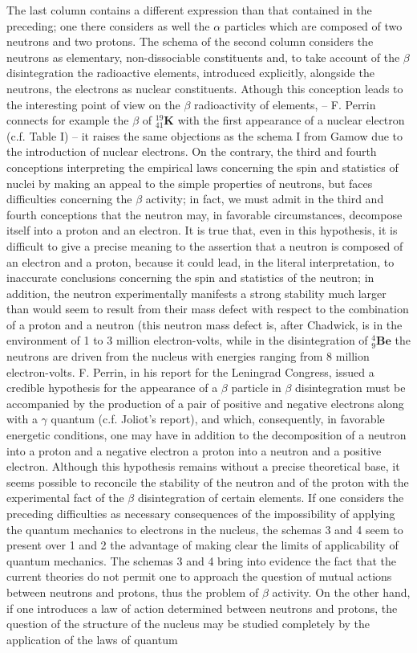 \documentclass{article}
\newcommand{\element}[1]{\textbf{#1}}
\newcommand{\isotope}[3]{
{{}^{#3}_{#2}\element{#1}}
}
\begin{document}
The last column contains a different expression than that contained in the preceding; one there considers as well the $\alpha$ particles which are composed of two neutrons and two protons. The schema of the second column considers the neutrons as elementary, non-dissociable constituents and, to take account of the $\beta$ disintegration the radioactive elements, introduced explicitly, alongside the neutrons, the electrons as nuclear constituents. Athough this conception leads to the interesting point of view on the $\beta$ radioactivity of elements, -- F. Perrin connects for example the $\beta$ of $\isotope{K}{41}{19}$ with the first appearance of a nuclear electron (c.f. Table I) -- it raises the same objections as the schema I from Gamow due to the introduction of nuclear electrons. On the contrary, the third and fourth conceptions interpreting the empirical laws concerning the spin and statistics of nuclei by making an appeal to the simple properties of neutrons, but faces difficulties concerning the $\beta$ activity; in fact, we must admit in the third and fourth conceptions that the neutron may, in favorable circumstances, decompose itself into a proton and an electron. It is true that, even in this hypothesis, it is difficult to give a precise meaning to the assertion that a neutron is composed of an electron and a proton, because it could lead, in the literal interpretation, to inaccurate conclusions concerning the spin and statistics of the neutron; in addition, the neutron experimentally manifests a strong stability much larger than would seem to result from their mass defect with respect to the combination of a proton and a neutron (this neutron mass defect is, after Chadwick, is in the environment of 1 to 3 million electron-volts, while in the disintegration of $\isotope{Be}{9}{4}$ the neutrons are driven from the nucleus with energies ranging from 8 million electron-volts. F. Perrin, in his report for the Leningrad Congress, issued a credible hypothesis for the appearance of a $\beta$ particle in $\beta$ disintegration must be accompanied by the production of a pair of positive and negative electrons along with a $\gamma$ quantum (c.f. Joliot's report), and which, consequently, in favorable energetic conditions, one may have in addition to the decomposition of a neutron into a proton and a negative electron a proton into a neutron and a positive electron. Although this hypothesis remains without a precise theoretical base, it seems possible to reconcile the stability of the neutron and of the proton with the experimental fact of the $\beta$ disintegration of certain elements. If one considers the preceding difficulties as necessary consequences of the impossibility of applying the quantum mechanics to electrons in the nucleus, the schemas 3 and 4 seem to present over 1 and 2 the advantage of making clear the limits of applicability of quantum mechanics. The schemas 3 and 4 bring into evidence the fact that the current theories do not permit one to approach the question of mutual actions between neutrons and protons, thus the problem of $\beta$ activity. On the other hand, if one introduces a law of action determined between neutrons and protons, the question of the structure of the nucleus may be studied completely by the application of the laws of quantum 
\end{document}
